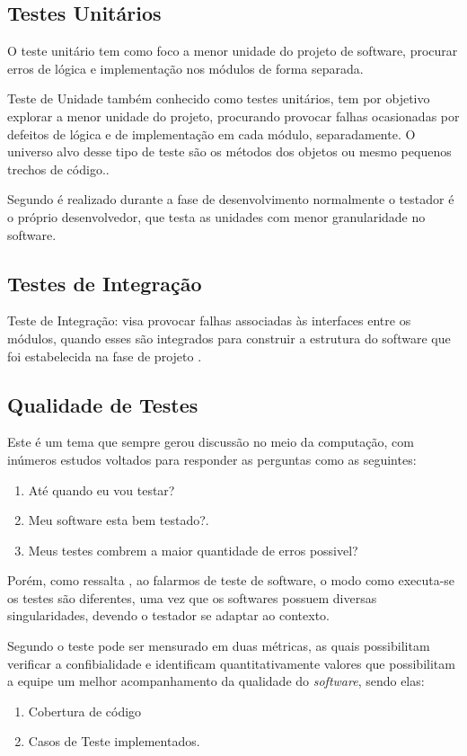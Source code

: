 \subsection{Testes Unitários}
        O teste unitário tem como foco a menor unidade do projeto de software, procurar erros de lógica e implementação nos módulos de forma separada.\cite{PRESSMAN}

         Teste de Unidade também conhecido como testes unitários, tem por objetivo explorar a menor unidade do projeto, procurando provocar falhas ocasionadas por defeitos de lógica e de implementação em cada módulo, separadamente. O universo alvo desse tipo de teste são os métodos dos objetos ou mesmo pequenos trechos de código.\cite{artigo_intro_teste}.

Segundo \cite{sw_test_tech} é realizado durante a fase de desenvolvimento normalmente o testador é o próprio desenvolvedor, que testa as unidades com menor granularidade no software.


\subsection{Testes de Integração}

Teste de Integração: visa provocar falhas associadas às interfaces entre os módulos, quando esses são integrados para construir a estrutura do software que foi estabelecida na fase de projeto \cite{artigo_intro_teste}.


\subsection{Qualidade de Testes}

Este é um tema que sempre gerou discussão no meio da computação, com inúmeros estudos voltados para responder as perguntas como as seguintes:

\begin{enumerate}
\item Até quando eu vou testar?
\item Meu software esta bem testado?.
\item Meus testes combrem a maior quantidade de erros possivel?
\end{enumerate}

Porém, como ressalta \cite{e08}, ao falarmos de teste de software, o modo como executa-se os testes são diferentes, uma vez que os softwares possuem diversas singularidades, devendo o testador se adaptar ao contexto.

Segundo \cite{e08} o teste pode ser mensurado em duas métricas, as quais possibilitam verificar a confibialidade e identificam quantitativamente valores que possibilitam a equipe um melhor acompanhamento da qualidade do \textit{software}, sendo elas:
\begin{enumerate}
\item Cobertura de código
\item Casos de Teste implementados.
\end{enumerate}
